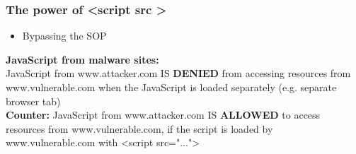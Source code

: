 \subsubsection{The power of \textless script src \textgreater}
\begin{itemize}
    \item Bypassing the SOP
\end{itemize}
\textbf{JavaScript from malware sites:}\\
JavaScript from www.attacker.com
IS \textbf{DENIED} from accessing resources
from www.vulnerable.com when the
JavaScript is loaded separately (e.g.
separate browser tab)\\
\textbf{Counter:}
JavaScript from www.attacker.com
IS \textbf{ALLOWED} to access resources
from www.vulnerable.com, if the
script is loaded by
www.vulnerable.com with
\textless script src="..."\textgreater

